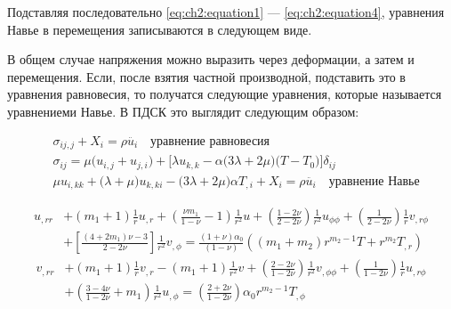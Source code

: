 Подставляя последовательно \cref{eq:ch2:equation1} --- \cref{eq:ch2:equation4}, уравнения Навье в перемещения записываются в следующем виде.

{\color{blue}
\begin{adjustwidth}{3.5em}{3.5em} В общем случае напряжения можно выразить через деформации, а затем и перемещения. Если, после взятия частной производной, подставить это в уравнения равновесия, то получатся следующие уравнения, которые называется уравнениеми Навье. В ПДСК это выглядит следующим образом:

\begin{equation*}
\begin{split}
	&\sigma_{ij,j} + X_i = \rho \ddot{u_i} \quad \text{уравнение равновесия} \\
	&\sigma_{ij} = \mu \big (u_{i,j} + u_{j,i} \big ) + \big [ \lambda u_{k,k} - \alpha \big (3 \lambda +2\mu \big ) \big (T-T_0 \big ) \big ] \delta_{ij}\\
	&\mu u_{i,kk} + \big ( \lambda + \mu \big ) u_{k,ki} - \big ( 3 \lambda + 2\mu \big ) \alpha T_{,i} +X_i = \rho \ddot{u_i} \quad \text{уравнение Навье}
\end{split}
\end{equation*}
\end{adjustwidth}
}

\begin{equation}
	\label{eq:ch2:equation6}
	\begin{split}
		u_{,rr} &+ \left ( m_1+1 \right ) \frac{1}{r} u_{,r} + \left ( \frac{\nu m_1}{1-\nu} -1 \right ) \frac{1}{r^2} u + \left ( \frac{1-2\nu}{2-2\nu} \right ) \frac{1}{r^2} u_{\phi \phi} + \left ( \frac{1}{2-2\nu}\right ) \frac{1}{r} v_{,r \phi} \\
		&+ \left [ \frac{\left ( 4+2 m_1\right ) \nu -3 }{2-2\nu} \right ] \frac{1}{r^2} v_{, \phi} = \frac{\left( 1+\nu \right ) \alpha_0 }{\left (1-\nu \right ) } \left ( \left (m_1 + m_2 \right ) r^{m_2 -1} T + r^{m_2} T_{,r}\right ) \end{split}
\end{equation}
\begin{equation}
	\label{eq:ch2:equation7}
		\begin{split}
		v_{,rr} &+ \left (m_1 +1 \right ) \frac{1}{r} v_{,r} - \left (m_1 + 1 \right ) \frac{1}{r^2} v + \left ( \frac{2-2\nu }{1-2\nu } \right ) \frac{1}{r^2} v_{,\phi \phi} + \left ( \frac{1}{1-2\nu} \right ) \frac{1}{r} u_{,r \phi} \\
		&+ \left ( \frac{3-4\nu}{1-2\nu} + m_1\right ) \frac{1}{r^2} u_{, \phi} = \left (\frac{2+2\nu}{1-2\nu} \right ) \alpha_0 r^{m_2 -1}  T_{,\phi}
	\end{split}
\end{equation}


